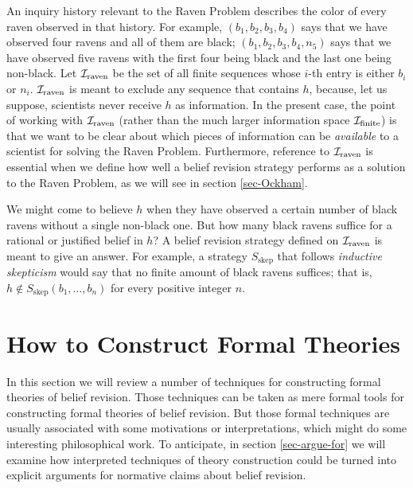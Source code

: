 \ed An inquiry history relevant to the Raven Problem describes the color of every raven observed in that history. For example, $(b_{1}, b_{2}, b_{3}, b_{4})$ says that we have observed four ravens and all of them are black; $(b_{1}, b_{2}, b_{3}, b_{4}, n_5)$ says that we have observed five ravens with the first four being black and the last one being non-black. Let ${\cal I}_{\textrm{raven}}$ be the set of all finite sequences whose $i$-th entry is either $b_{i}$ or $n_{i}$. ${\cal I}_{\textrm{raven}}$ is meant to exclude any sequence that contains $h$, because, let us suppose, scientists never receive $h$ as information. In the present case, the point of working with ${\cal I}_{\textrm{raven}}$ (rather than the much larger information space ${\cal I}_{\textrm{finite}}$) is that we want to be clear about which pieces of information can be {\em available} to a scientist for solving the Raven Problem. Furthermore, reference to ${\cal I}_{\textrm{raven}}$ is essential when we define how well a belief revision strategy performs as a solution to the Raven Problem, as we will see in section \ref{sec-Ockham}.

We might come to believe $h$ when they have observed a certain number of black ravens without a single non-black one. But how many black ravens suffice for a rational or justified belief in $h$? A belief revision strategy defined on ${\cal I}_{\textrm{raven}}$ is meant to give an answer. For example, a strategy $S_{\textrm{skep}}$ that follows {\em inductive skepticism} would say that no finite amount of black ravens suffices; that is, $h \not\in S_{\textrm{skep}}(b_1, \ldots, b_n)$ for every positive integer $n$.



\section{How to Construct Formal Theories}\label{sec-how-to-construct}

In this section we will review a number of techniques for constructing formal theories of belief revision. Those techniques can be taken as mere formal tools for constructing formal theories of belief revision. But those formal techniques are usually associated with some motivations or interpretations, which might do some interesting philosophical work. To anticipate, in section \ref{sec-argue-for} we will examine how interpreted techniques of theory construction could be turned into explicit arguments for normative claims about belief revision.


